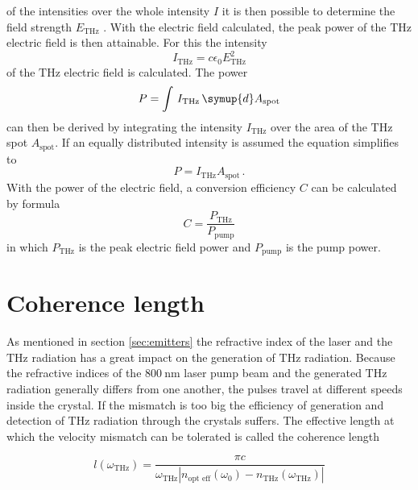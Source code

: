 of the intensities over the whole intensity $I$ it is then possible to determine the field strength $E_\text{THz}$ \cite{THZ_eltric_field}.
With the electric field calculated, the peak power of the $\si{\tera\hertz}$ electric field is then attainable.
For this the intensity
\begin{equation}
    I_\text{THz} = c \epsilon_0 E_\text{THz}^2
    \label{eq:intensity}
\end{equation}
of the $\si{\tera\hertz}$ electric field is calculated.
The power 
\begin{equation}
    P = \int\, I_\text{THz} \,\symup{d}A_\text{spot}
\end{equation}
can then be derived by integrating the intensity $I_\text{THz}$ over the area of the $\si{\tera\hertz}$ spot $A_\text{spot}$.
If an equally distributed intensity is assumed the equation simplifies to 
\begin{equation}
    P = I_\text{THz}A_\text{spot}\,.
    \label{eq:power}
\end{equation}
With the power of the electric field, a conversion efficiency $C$ can be calculated by formula
\begin{equation}
    C = \frac{P_\text{THz}}{P_\text{pump}}
    \label{eq:conversion}
\end{equation}
in which $P_\text{THz}$ is the peak electric field power and $P_\text{pump}$ is the pump power.


\section{Coherence length}
\label{sec:coherence_length}
As mentioned in section \ref{sec:emitters} the refractive index of the laser and the $\si{\tera\hertz}$ radiation has a great impact on the generation of $\si{\tera\hertz}$ radiation.
Because the refractive indices of the $\SI{800}{\nano\meter}$ laser pump beam and the generated $\si{\tera\hertz}$ radiation generally differs from one another, the pulses travel at different speeds inside the crystal.
If the mismatch is too big the efficiency of generation and detection of $\si{\tera\hertz}$ radiation through the crystals suffers.
The effective length at which the velocity mismatch can be tolerated is called the coherence length

\begin{equation}
    l(\omega_{\si{\tera\hertz}}) = \frac{\pi c}{\omega_{\si{\tera\hertz}} \left | n_\text{opt eff}(\omega_0) - n_{\si{\tera\hertz}}(\omega_{\si{\tera\hertz}})\right |}
\end{equation}


